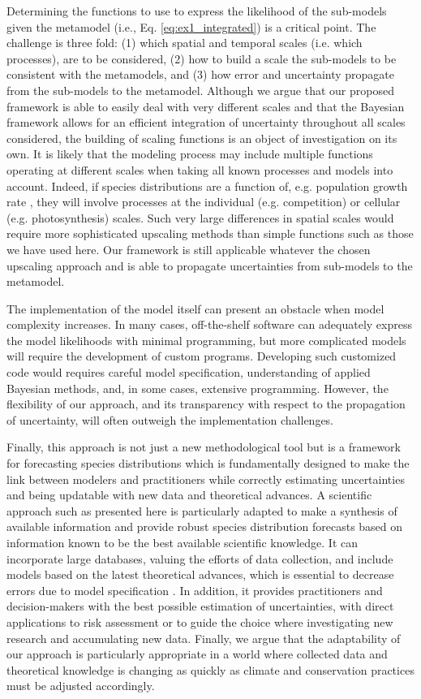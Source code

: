 \documentclass[11pt]{article}
\begin{document}
Determining the functions to use to express the likelihood of the sub-models given the metamodel (i.e., Eq. \ref{eq:ex1_integrated}) is a critical point.
The challenge is three fold: (1) which spatial and temporal scales (i.e. which processes), are to be considered, (2) how to build a scale the sub-models to be consistent with the metamodels, and (3) how error and uncertainty propagate from the sub-models to the metamodel. 
Although we argue that our proposed framework is able to easily deal with very different scales and that the Bayesian framework allows for an efficient integration of uncertainty throughout all scales considered, the building of scaling functions is an object of investigation on its own. 
It is likely that the modeling process may include multiple functions operating at different scales when taking all known processes and models into account. 
Indeed, if species distributions are a function of, e.g. population growth rate \citep{Guisan2000}, they will involve processes at the individual (e.g. competition) or cellular (e.g. photosynthesis) scales. Such very large differences in spatial scales would require more sophisticated upscaling methods than simple functions such as those we have used here. Our framework is still applicable whatever the chosen upscaling approach and is able to propagate uncertainties from sub-models to the metamodel.

The implementation of the model itself can present an obstacle when model complexity increases. 
In many cases, off-the-shelf software can adequately express the model likelihoods with minimal programming, but more complicated models will require the development of custom programs. 
Developing such customized code would requires careful model specification, understanding of applied Bayesian methods, and, in some cases, extensive programming. 
However, the flexibility of our approach, and its transparency with respect to the propagation of uncertainty, will often outweigh the implementation challenges.

Finally, this approach is not just a new methodological tool but is a framework for forecasting species distributions which is fundamentally designed to make the link between modelers and practitioners while correctly estimating uncertainties and being updatable with new data and theoretical advances. 
A scientific approach such as presented here is particularly adapted to make a synthesis of available information and provide robust species distribution forecasts based on information known to be the best available scientific knowledge. 
It can incorporate large databases, valuing the efforts of data collection, and include models based on the latest theoretical advances, which is essential to decrease errors due to model specification \citep{Austin2007}. 
In addition, it provides practitioners and decision-makers with the best possible estimation of uncertainties, with direct applications to risk assessment or to guide the choice where investigating new research and accumulating new data. 
Finally, we argue that the adaptability of our approach is particularly appropriate in a world where collected data and theoretical knowledge is changing as quickly as climate and conservation practices must be adjusted accordingly.
\end{document}
